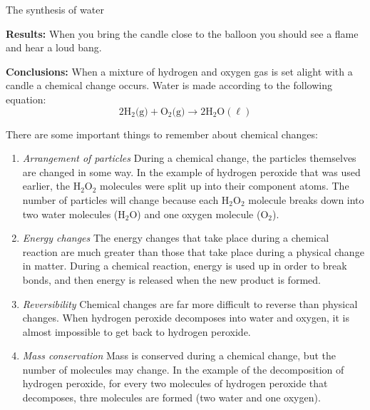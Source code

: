 \begin{g_experiment}{The synthesis of water}
        \par 
        \label{m38709*id63254}\noindent{}\textbf{Results:}\newline
When you bring the candle close to the balloon you should see a flame and hear a loud bang.\par 
        \label{m38709*id63302}\noindent{}\textbf{Conclusions:}\newline
When a mixture of hydrogen and oxygen gas is set alight with a candle a chemical change occurs. Water is made according to the following equation:
        \label{m38709*id63313}\nopagebreak\noindent{}
    \begin{equation*}
    2{\text{H}}_{2} \text{(g)} + {\text{O}}_{2}\text{(g)} \to 2\text{H}_{2}\text{O}(\ell)
      \end{equation*}   
\end{g_experiment}
      \label{m38709*id62865}There are some important things to remember about chemical changes:\par 
      \label{m38709*id62869}\begin{enumerate}[noitemsep, label=\textbf{\arabic*}. ] 
            \label{m38709*uid6}\item \textsl{Arrangement of particles}\newline
During a chemical change, the particles themselves are changed in some way. In the example of hydrogen peroxide that was used earlier, the $\text{H}_{2}\text{O}_{2}$ molecules were split up into their component atoms. The number of particles will change because each $\text{H}_{2}\text{O}_{2}$ molecule breaks down into two water molecules ($\text{H}_{2}\text{O}$) and one oxygen molecule ($\text{O}_{2}$).
\label{m38709*uid7}\item \textsl{Energy changes}\newline
The energy changes that take place during a chemical reaction are much greater than those that take place during a physical change in matter. During a chemical reaction, energy is used up in order to break bonds, and then energy is released when the new product is formed. 
\label{m38709*uid8}\item \textsl{Reversibility}\newline
Chemical changes are far more difficult to reverse than physical changes. When hydrogen peroxide decomposes into water and oxygen, it is almost impossible to get back to hydrogen peroxide.
\item \textsl{Mass conservation}\newline
Mass is conserved during a chemical change, but the number of molecules may change. In the example of the decomposition of hydrogen peroxide, for every two molecules of hydrogen peroxide that decomposes, thre molecules are formed (two water and one oxygen).
\end{enumerate}
